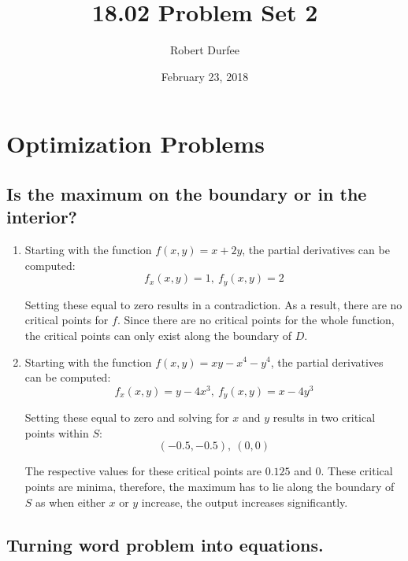 \documentclass{article}
\title{ 18.02 Problem Set 2 }
\author{ Robert Durfee }
\date{ February 23, 2018 }
\begin{document}
\maketitle

\section{ Optimization Problems }

\subsection{Is the maximum on the boundary or in the interior?}

\begin{enumerate}[1.]
  \item Starting with the function $f(x, y) = x + 2y$, the partial derivatives
    can be computed:
    $$ f_{x}(x, y) = 1,\ f_{y}(x, y) = 2 $$

    Setting these equal to zero results in a contradiction. As a result, there
    are no critical points for $f$. Since there are no critical points for the
    whole function, the critical points can only exist along the boundary of
    $D$.

  \item Starting with the function $f(x, y) = xy - x^{4} - y^{4}$, the partial
    derivatives can be computed:
    $$ f_{x}(x, y) = y - 4x^{3},\ f_{y}(x, y) = x - 4y^{3} $$

    Setting these equal to zero and solving for $x$ and $y$ results in two
    critical points within $S$:
    $$ (-0.5, -0.5),\ (0, 0) $$

    The respective values for these critical points are $0.125$ and $0$. These
    critical points are minima, therefore, the maximum has to lie along the
    boundary of $S$ as when either $x$ or $y$ increase, the output increases
    significantly.

\end{enumerate}

\subsection{Turning word problem into equations.}
\end{document}

